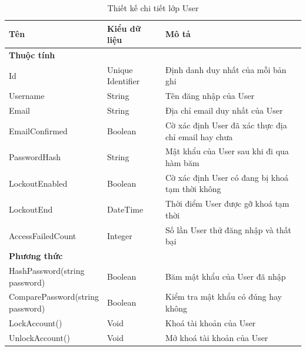 \documentclass[../DoAn.tex]{subfiles}
\begin{document}
\begin{table}[H]
    \renewcommand{\arraystretch}{1.2}
    \centering{}
    \begin{tabular}{p{0.3\linewidth}p{0.2\linewidth}p{0.5\linewidth}}
        \hline
        \textbf{Tên}                     & \textbf{Kiểu dữ liệu} & \textbf{Mô tả}                                      \\ \hline
        \textbf{Thuộc tính}                                                                                            \\ \hline
        Id                               & Unique Identifier     & Định danh duy nhất của mỗi bản ghi                  \\ \hline
        Username                         & String                & Tên đăng nhập của User                              \\ \hline
        Email                            & String                & Địa chỉ email duy nhất của User                     \\ \hline
        EmailConfirmed                   & Boolean               & Cờ xác định User đã xác thực địa chỉ email hay chưa \\ \hline
        PasswordHash                     & String                & Mật khẩu của User sau khi đi qua hàm băm            \\ \hline
        LockoutEnabled                   & Boolean               & Cờ xác định User có đang bị khoá tạm thời không     \\ \hline
        LockoutEnd                       & DateTime              & Thời điểm User được gỡ khoá tạm thời                \\ \hline
        AccessFailedCount                & Integer               & Số lần User thử đăng nhập và thất bại               \\ \hline
        \textbf{Phương thức}                                                                                           \\ \hline
        HashPassword(string password)    & Boolean               & Băm mật khẩu của User đã nhập                       \\ \hline
        ComparePassword(string password) & Boolean               & Kiểm tra mật khẩu có đúng hay không                 \\ \hline
        LockAccount()                    & Void                  & Khoá tài khoản của User                             \\ \hline
        UnlockAccount()                  & Void                  & Mở khoá tài khoản của User                          \\ \hline
    \end{tabular}
    \renewcommand{\arraystretch}{1}
    \caption{Thiết kế chi tiết lớp User}
    \label{fig:classdesign_user}
\end{table}
\end{document}
